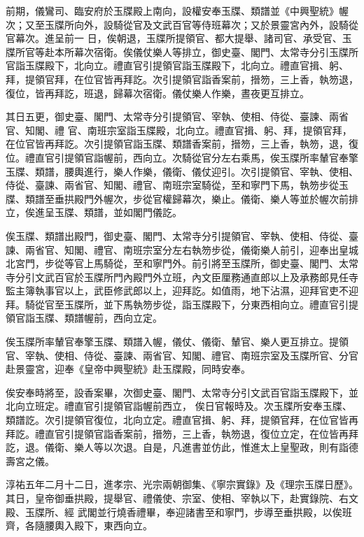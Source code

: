 \begin{pinyinscope}
 前期，儀鸞司、臨安府於玉牒殿上南向，設權安奉玉牒、類譜並《中興聖統》幄次；又至玉牒所向外，設騎從官及文武百官等侍班幕次；又於景靈宮內外，設騎從官幕次。進呈前一
 日，俟朝退，玉牒所提領官、都大提舉、諸司官、承受官、玉牒所官等赴本所幕次宿衛。俟儀仗樂人等排立，御史臺、閣門、太常寺分引玉牒所官詣玉牒殿下，北向立。禮直官引提領官詣玉牒殿下，北向立。禮直官揖、躬、拜，提領官拜，在位官皆再拜訖。次引提領官詣香案前，搢笏，三上香，執笏退，復位，皆再拜訖，班退，歸幕次宿衛。儀仗樂人作樂，晝夜更互排立。



 其日五更，御史臺、閣門、太常寺分引提領官、宰執、使相、侍從、臺諫、兩省官、知閣、禮
 官、南班宗室詣玉牒殿，北向立。禮直官揖、躬、拜，提領官拜，在位官皆再拜訖。次引提領官詣玉牒、類譜香案前，搢笏，三上香，執笏，退，復位。禮直官引提領官詣幄前，西向立。次騎從官分左右乘馬，俟玉牒所率輦官奉擎玉牒、類譜，腰輿進行，樂人作樂，儀衛、儀仗迎引。次引提領官、宰執、使相、侍從、臺諫、兩省官、知閣、禮官、南班宗室騎從，至和寧門下馬，執笏步從玉牒、類譜至垂拱殿門外幄次，步從官權歸幕次，樂止。儀衛、樂人等並於幄次前排
 立，俟進呈玉牒、類譜，並如閣門儀訖。



 俟玉牒、類譜出殿門，御史臺、閣門、太常寺分引提領官、宰執、使相、侍從、臺諫、兩省官、知閣、禮官、南班宗室分左右執笏步從，儀衛樂人前引，迎奉出皇城北宮門，步從等官上馬騎從，至和寧門外。前引將至玉牒所，御史臺、閣門、太常寺分引文武百官於玉牒所門內殿門外立班，內文臣厘務通直郎以上及承務郎見任寺監主簿執事官以上，武臣修武郎以上，迎拜訖。如值雨，地下沾濕，迎拜官吏不迎
 拜。騎從官至玉牒所，並下馬執笏步從，詣玉牒殿下，分東西相向立。禮直官引提領官詣玉牒、類譜幄前，西向立定。



 俟玉牒所率輦官奉擎玉牒、類譜入幄，儀仗、儀衛、輦官、樂人更互排立。提領官、宰執、使相、侍從、臺諫、兩省官、知閣、禮官、南班宗室及玉牒所官、分官赴景靈宮，迎奉《皇帝中興聖統》赴玉牒殿，同時安奉。



 俟安奉時將至，設香案畢，次御史臺、閣門、太常寺分引文武百官詣玉牒殿下，並北向立班定。禮直官引提領官詣幄前西立，
 俟日官報時及。次玉牒所安奉玉牒、類譜訖。次引提領官復位，北向立定。禮直官揖、躬、拜，提領官拜，在位官皆再拜訖。禮直官引提領官詣香案前，搢笏，三上香，執笏退，復位立定，在位皆再拜訖，退。儀衛、樂人等以次退。自是，凡進書並仿此，惟進太上皇聖政，則有詣德壽宮之儀。



 淳祐五年二月十二日，進孝宗、光宗兩朝御集、《寧宗實錄》及《理宗玉牒日歷》。其日，皇帝御垂拱殿，提舉官、禮儀使、宗室、使相、宰執以下，赴實錄院、右文殿、玉牒所、經
 武閣並行燒香禮畢，奉迎諸書至和寧門，步導至垂拱殿，以俟班齊，各隨腰輿入殿下，東西向立。




\end{pinyinscope}
